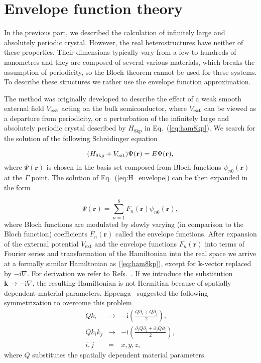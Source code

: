 

\section{Envelope function theory}
\label{secTheorEnvelope}

In the previous part, we described the calculation of infinitely large and absolutely periodic crystal. However, the real heterostructures have neither of these properties. Their dimensions typically vary from a few to hundreds of nanometres and they are composed of several various materials, which breaks the assumption of periodicity, so the Bloch theorem cannot be used for these systems. To describe these structures we rather use the envelope function approximation.

The method was originally developed to describe the effect of a weak smooth external field $V_{\rm ext}$ acting on the bulk semiconductor, where $V_{\rm ext}$ can be viewed as a departure from periodicity, or a perturbation of the infinitely large and absolutely periodic crystal described by  $H_\mathrm{8kp}$ in Eq.~(\ref{eq:ham8kp}). We search for the solution of the following Schr\"{o}dinger equation

\begin{equation}
(H_\mathrm{8kp}+V_{\rm ext})\Psi(\mathbf{r})=E\Psi(\mathbf{r}), \label{eq:H_envelope}
\end{equation}
where $\Psi(\mathbf{r})$ is chosen in the basis set composed from Bloch functions $\psi_{n0}(\mathbf{r})$ at the $\Gamma$ point. The solution of Eq.~(\ref{eq:H_envelope}) can be then expanded in the form
 
 \begin{equation}
 \label{eqEnvelope}
 \Psi(\mathbf{r})=\sum_{n=1}^8 F_n(\mathbf{r})\psi_{n0}(\mathbf{r}),
 \end{equation}
where Bloch functions are modulated by slowly varying (in comparison to the Bloch function) coefficients $F_n(\mathbf{r})$ called the envelope functions. After expansion of the external potential $V_\mathrm{ext}$ and the envelope functions $F_n(\mathbf{r})$ into terms of Fourier series and transformation of the Hamiltonian into the real space we arrive at a formally similar Hamiltonian as (\ref{eq:ham8kp}), except for $\mathbf{k}$-vector replaced by $-\mathrm{i}\nabla$. For derivation we refer to Refs.~\citep{Bastard1,Bastard2}. If we introduce the substitution $\mathbf{k}\rightarrow -\mathrm{i}\nabla$, the resulting Hamiltonian is not Hermitian because of spatially dependent material parameters. Eppenga~\citep{Eppenga} suggested the following symmetrization to overcome this problem
\begin{eqnarray}
Qk_i&\rightarrow&-\mathrm{i}\left(\frac{Q\partial_i+Q\partial_j}{2}\right),\nonumber\\
Qk_ik_j&\rightarrow&-\mathrm{i}\left(\frac{\partial_iQ\partial_j+\partial_jQ\partial_i}{2}\right),\nonumber\\
i,j&=&x,y,z,\nonumber
\end{eqnarray}
where $Q$ substitutes the spatially dependent material parameters. 

